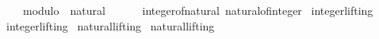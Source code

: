 \begin{isabellebody}
\ \ \ \ {\isachardoublequoteopen}modulo\ {\isacharcolon}{\kern0pt}{\isacharcolon}{\kern0pt}\ natural\ {\isasymRightarrow}\ {\isacharunderscore}{\kern0pt}{\isachardoublequoteclose}\isanewline
\ \ \ \ integer{\isacharunderscore}{\kern0pt}of{\isacharunderscore}{\kern0pt}natural\ natural{\isacharunderscore}{\kern0pt}of{\isacharunderscore}{\kern0pt}integer\isanewline
\isanewline
{}\isamarkupfalse%
\ integer{\isachardot}{\kern0pt}lifting\isanewline
{}\isamarkupfalse%
\ integer{\isachardot}{\kern0pt}lifting\isanewline
\isanewline
{}\isamarkupfalse%
\ natural{\isachardot}{\kern0pt}lifting\isanewline
{}\isamarkupfalse%
\ natural{\isachardot}{\kern0pt}lifting\isanewline
%
\isadelimtheory
\isanewline
%
\endisadelimtheory
%
\isatagtheory
{}\isamarkupfalse%
%
\endisatagtheory
{\isafoldtheory}%
%
\isadelimtheory
%
\endisadelimtheory
%
\end{isabellebody}%
\endinput
